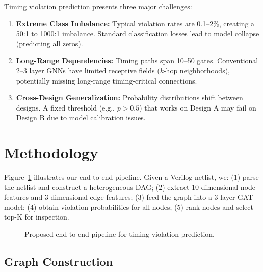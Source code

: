 \documentclass[10pt,twocolumn,journal]{IEEEtran}
\begin{document}
Timing violation prediction presents three major challenges:
\begin{enumerate}
    \item \textbf{Extreme Class Imbalance:} Typical violation rates are 0.1--2\%, creating a 50:1 to 1000:1 imbalance. Standard classification losses lead to model collapse (predicting all zeros).
    
    \item \textbf{Long-Range Dependencies:} Timing paths span 10--50 gates. Conventional 2--3 layer GNNs have limited receptive fields ($k$-hop neighborhoods), potentially missing long-range timing-critical connections.
    
    \item \textbf{Cross-Design Generalization:} Probability distributions shift between designs. A fixed threshold (e.g., $p > 0.5$) that works on Design A may fail on Design B due to model calibration issues.
\end{enumerate}
\section{Methodology}
\label{sec:method}

Figure~\ref{fig:pipeline} illustrates our end-to-end pipeline. Given a Verilog netlist, we: (1) parse the netlist and construct a heterogeneous DAG; (2) extract 10-dimensional node features and 3-dimensional edge features; (3) feed the graph into a 3-layer GAT model; (4) obtain violation probabilities for all nodes; (5) rank nodes and select top-K for inspection.

\begin{figure}[t]
\centering
{}
\caption{Proposed end-to-end pipeline for timing violation prediction.}
\label{fig:pipeline}
\end{figure}

\subsection{Graph Construction}
\end{document}
